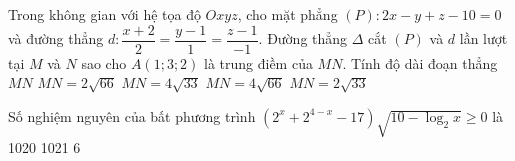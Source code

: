 \begin{ex} %
 Trong không gian với hệ tọa độ $O x y z$, cho mặt phẳng $(P): 2 x-y+z-10=0$ và đường thẳng $d: \dfrac{x+2}{2}=\dfrac{y-1}{1}=\dfrac{z-1}{-1}$. Đường thẳng $\Delta$ cắt $(P)$ và $d$ lần lượt tại $M$ và $N$ sao cho $A(1; 3; 2)$ là trung điềm của $M N$. Tính độ dài đoạn thẳng $M N$
\choice
{$M N=2 \sqrt{66}$}
{\True $M N=4 \sqrt{33}$}
{$M N=4 \sqrt{66}$}
{$M N=2 \sqrt{33}$}
\end{ex}

\begin{ex} %
 Số nghiệm nguyên của bất phương trình $\left(2^{x}+2^{4-x}-17\right) \sqrt{10-\log _{2} x} \geq 0$ là
\choice
{1020}
{1021}
{}
{6}
\end{ex}
